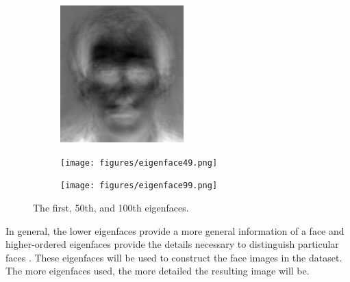 \begin{figure}[H] %
\centering
\begin{subfigure}{.32\textwidth}
    \centering
    \includegraphics[width=\textwidth]{figures/eigenface0.png}
\end{subfigure}
%
\begin{subfigure}{.32\textwidth}
    \centering
    \texttt{[image: figures/eigenface49.png]}
\end{subfigure}
%
\begin{subfigure}{.32\textwidth}
    \centering
    \texttt{[image: figures/eigenface99.png]}
\end{subfigure}
\caption{The first, 50th, and 100th eigenfaces.}
\label{fig:facerec-eigenfaces}
\end{figure}

In general, the lower eigenfaces provide a more general information of a face and higher-ordered eigenfaces provide the details necessary to distinguish particular faces \cite{muller2004singular}.
These eigenfaces will be used to construct the face images in the dataset.
The more eigenfaces used, the more detailed the resulting image will be.

